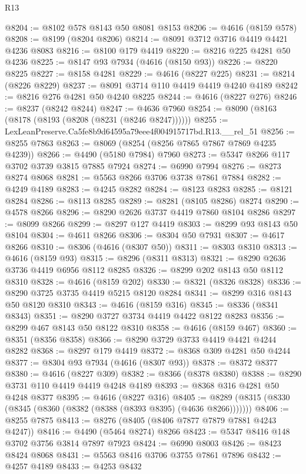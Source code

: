 \begin{lexlean}{R13}
\begin{coremodule}
@8204 := @8102 @578 @8143 @50 @8081 @8153
@8206 := @4616 (@8159 @578)
@8208 := @8199 (@8204 @8206)
@8214 := @8091 @3712 @3716 @4419 @4421 @4236 @8083
@8216 := @8100 @179 @4419
@8220 := @8216 @225 @4281 @50 @4236
@8225 := @8147 @93 @7934 (@4616 (@8150 @93))
@8226 := @8220 @8225
@8227 := @8158 @4281
@8229 := @4616 (@8227 @225)
@8231 := @8214 (@8226 @8229)
@8237 := @8091 @3714 @110 @4419 @4419 @4240 @4189
@8242 := @8216 @276 @4281 @50 @4240 @8225
@8244 := @4616 (@8227 @276)
@8246 := @8237 (@8242 @8244)
@8247 := @4636 @7960
@8254 := @8090 (@8163 (@8178 (@8193 (@8208 (@8231 (@8246 @8247))))))
@8255 := LexLeanPreserve.Ca5fe8b9d64595a79eee4f004915717bd.R13.__rel_51
@8256 := @8255 @7863
@8263 := @8069 (@8254 (@8256 @7865 @7867 @7869 @4235 @4239))
@8266 := @4490 (@5180 @7984) @7960
@8273 := @5347 @8266 @117 @3702 @3739 @3815 @7885 @7924
@8274 := @6990 @7994
@8276 := @8273 @8274 @8068
@8281 := @5563 @8266 @3706 @3738 @7861 @7884
@8282 := @4249 @4189
@8283 := @4245 @8282
@8284 := @8123 @8283
@8285 := @8121 @8284
@8286 := @8113 @8285
@8289 := @8281 (@8105 @8286) @8274
@8290 := @4578 @8266
@8296 := @8290 @2626 @3737 @4419 @7860 @8104 @8286
@8297 := @8099 @8266
@8299 := @8297 @127 @4419
@8303 := @8299 @93 @8143 @50 @8104
@8304 := @4611 @8266
@8306 := @8304 @50 @7931
@8307 := @4617 @8266
@8310 := @8306 (@4616 (@8307 @50))
@8311 := @8303 @8310
@8313 := @4616 (@8159 @93)
@8315 := @8296 (@8311 @8313)
@8321 := @8290 @2636 @3736 @4419 @6956 @8112 @8285
@8326 := @8299 @202 @8143 @50 @8112 @8310
@8328 := @4616 (@8159 @202)
@8330 := @8321 (@8326 @8328)
@8336 := @8290 @3725 @3735 @4419 @5215 @8120 @8284
@8341 := @8299 @316 @8143 @50 @8120 @8310
@8343 := @4616 (@8159 @316)
@8345 := @8336 (@8341 @8343)
@8351 := @8290 @3727 @3734 @4419 @4422 @8122 @8283
@8356 := @8299 @467 @8143 @50 @8122 @8310
@8358 := @4616 (@8159 @467)
@8360 := @8351 (@8356 @8358)
@8366 := @8290 @3729 @3733 @4419 @4421 @4244 @8282
@8368 := @8297 @179 @4419
@8372 := @8368 @309 @4281 @50 @4244
@8377 := @8304 @93 @7934 (@4616 (@8307 @93))
@8378 := @8372 @8377
@8380 := @4616 (@8227 @309)
@8382 := @8366 (@8378 @8380)
@8388 := @8290 @3731 @110 @4419 @4419 @4248 @4189
@8393 := @8368 @316 @4281 @50 @4248 @8377
@8395 := @4616 (@8227 @316)
@8405 := @8289 (@8315 (@8330 (@8345 (@8360 (@8382 (@8388 (@8393 @8395) (@4636 @8266)))))))
@8406 := @8255 @7875
@8413 := @8276 (@8405 (@8406 @7877 @7879 @7881 @4243 @4247))
@8416 := @4490 (@5464 @8274) @8266
@8423 := @5347 @8416 @148 @3702 @3756 @3814 @7897 @7923
@8424 := @6990 @8003
@8426 := @8423 @8424 @8068
@8431 := @5563 @8416 @3706 @3755 @7861 @7896
@8432 := @4257 @4189
@8433 := @4253 @8432

\end{coremodule}
\end{lexlean}
